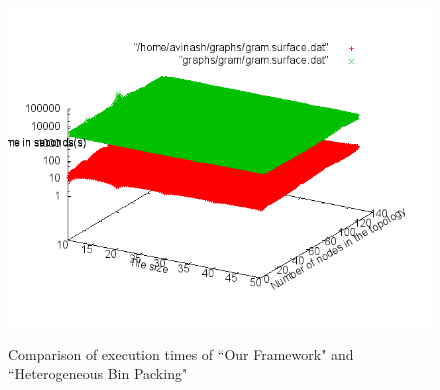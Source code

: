 \begin{figure}[t!]
{    \includegraphics[angle=0, scale=0.7]{./figures/gram_surface}
    \label{fig:gram1ho}
  }
  \caption{Comparison of execution times of ``Our Framework" and
    ``Heterogeneous Bin Packing"}
  \label{fig:ho}
\end{figure}


